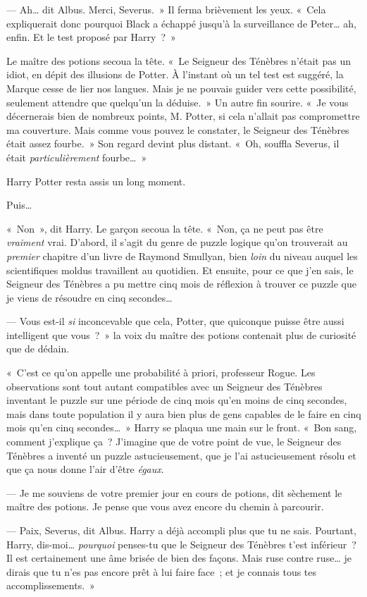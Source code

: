 --- Ah… dit Albus.
Merci, Severus.~»
Il ferma brièvement les yeux.
«~Cela expliquerait donc pourquoi Black a échappé jusqu'à la surveillance de Peter… ah, enfin.
Et le test proposé par Harry~?~»

Le maître des potions secoua la tête.
«~Le Seigneur des Ténèbres n'était pas un idiot, en dépit des illusions de Potter.
À l'instant où un tel test est suggéré, la Marque cesse de lier nos langues.
Mais je ne pouvais guider vers cette possibilité, seulement attendre que quelqu'un la déduise.~»
Un autre fin sourire.
«~Je vous décernerais bien de nombreux points, M. Potter, si cela n'allait pas compromettre ma couverture.
Mais comme vous pouvez le constater, le Seigneur des Ténèbres était assez fourbe.~»
Son regard devint plus distant.
«~Oh, souffla Severus, il était \emph{particulièrement} fourbe…~»

Harry Potter resta assis un long moment.

Puis…

«~Non~», dit Harry.
Le garçon secoua la tête.
«~Non, ça ne peut pas être \emph{vraiment} vrai.
D'abord, il s'agit du genre de puzzle logique qu'on trouverait au \emph{premier} chapitre d'un livre de Raymond Smullyan, bien \emph{loin} du niveau auquel les scientifiques moldus travaillent au quotidien.
Et ensuite, pour ce que j'en sais, le Seigneur des Ténèbres a pu mettre cinq mois de réflexion à trouver ce puzzle que je viens de résoudre en cinq secondes…

--- Vous est-il \emph{si} inconcevable que cela, Potter, que quiconque puisse être aussi intelligent que vous~?~»
la voix du maître des potions contenait plus de curiosité que de dédain.

«~C'est ce qu'on appelle une probabilité à priori, professeur Rogue.
Les observations sont tout autant compatibles avec un Seigneur des Ténèbres inventant le puzzle sur une période de cinq mois qu'en moins de cinq secondes, mais dans toute population il y aura bien plus de gens capables de le faire en cinq mois qu'en cinq secondes…~»
Harry se plaqua une main sur le front.
«~Bon sang, comment j'explique ça~?
J'imagine que de votre point de vue, le Seigneur des Ténèbres a inventé un puzzle astucieusement, que je l'ai astucieusement résolu et que ça nous donne l'air d'être \emph{égaux}.

--- Je me souviens de votre premier jour en cours de potions, dit sèchement le maître des potions.
Je pense que vous avez encore du chemin à parcourir.

--- Paix, Severus, dit Albus.
Harry a déjà accompli plus que tu ne sais.
Pourtant, Harry, dis-moi…
\emph{pourquoi} penses-tu que le Seigneur des Ténèbres t'est inférieur~?
Il est certainement une âme brisée de bien des façons.
Mais ruse contre ruse… je dirais que tu n'es pas encore prêt à lui faire face~; et je connais tous tes accomplissements.~»

